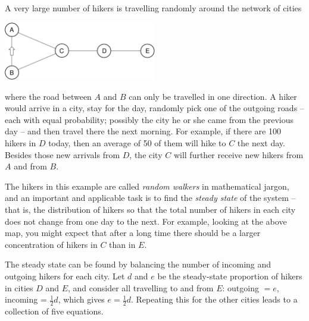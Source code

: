 \begin{application}
A very large number of hikers is travelling randomly around the network of cities
\begin{center}
	\includegraphics[width=0.5\textwidth]{./Figures/network.pdf}
\end{center}
where the road between $A$ and $B$ can only be travelled in one direction. A hiker would arrive in a city, stay for the day, randomly pick one of the outgoing roads -- each with equal probability; possibly the city he or she came from the previous day --  and then travel there the next morning. For example, if there are 100 hikers in $D$ today, then an average of 50 of them will hike to $C$ the next day. Besides those new arrivals from $D$, the city $C$ will further receive new hikers from $A$ and from $B$.

The hikers in this example are called \emph{random walkers} in mathematical jargon, and an important and applicable task is to find the \emph{steady state} of the system -- that is, the distribution of hikers so that the total number of hikers in each city does not change from one day to the next. For example, looking at the above map, you might expect that after a long time there should be a larger concentration of hikers in $C$ than in $E$.

The steady state  can be found by balancing the number of incoming and outgoing hikers for each city. Let $d$ and $e$ be the steady-state proportion of hikers in cities $D$ and $E$, and consider all travelling to and from $E$: outgoing $= e$, incoming = $\tfrac12d$, which gives $e = \tfrac12d$. Repeating this for the other cities leads to a collection of five equations.


\end{application}
